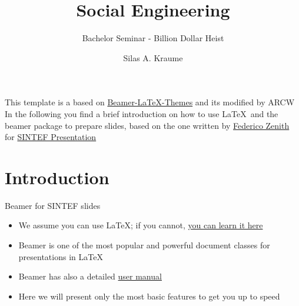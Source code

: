 \documentclass{beamer}
\title{Social Engineering}
\subtitle{Bachelor Seminar - Billion Dollar Heist}
\author{Silas A. Kraume}
\date{}
\newcommand{\hrefcol}[2]{\textcolor{cyan}{\href{#1}{#2}}}
\begin{document}
\maketitle

\begin{frame}
    This template is a based on \hrefcol{https://github.com/TOB-KNPOB/Beamer-LaTeX-Themes}{Beamer-LaTeX-Themes} and its modified by ARCW
    \vspace{\baselineskip}
    In the following you find a brief introduction on how to use \LaTeX\ and the beamer package to prepare slides, based on the one written by \hrefcol{mailto:federico.zenith@sintef.no}{Federico Zenith} for \hrefcol{https://www.overleaf.com/latex/templates/sintef-presentation/jhbhdffczpnx}{SINTEF Presentation}
\end{frame}

\section{Introduction}

\begin{frame}{Beamer for SINTEF slides}
    \begin{itemize}
        \item We assume you can use \LaTeX; if you cannot,
              \hrefcol{http://en.wikibooks.org/wiki/LaTeX/}{you can learn it here}
        \item Beamer is one of the most popular and powerful document
              classes for presentations in \LaTeX
        \item Beamer has also a detailed
              \hrefcol{http://www.ctan.org/tex-archive/macros/latex/contrib/beamer/doc/beameruserguide.pdf}{user
                  manual}
        \item Here we will present only the most basic features to get you up to speed
    \end{itemize}
\end{frame}
\end{document}
